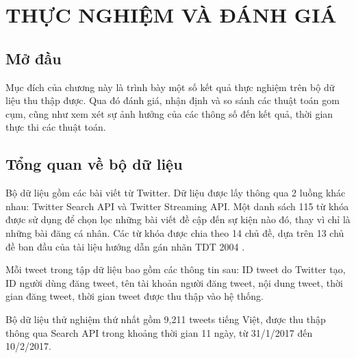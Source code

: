 \chapter{THỰC NGHIỆM VÀ ĐÁNH GIÁ}
\ifpdf
    \graphicspath{{Chapter4/Chapter4Figs/PNG/}{Chapter4/Chapter4Figs/PDF/}{Chapter4/Chapter4Figs/}}
\else
    \graphicspath{{Chapter4/Chapter4Figs/EPS/}{Chapter4/Chapter4Figs/}}
\fi

\section{Mở đầu}
Mục đích của chương này là trình bày một số kết quả thực nghiệm trên bộ dữ liệu thu thập được. Qua đó đánh giá, nhận định và so sánh các thuật toán gom cụm, cũng như xem xét sự ảnh hưởng của các thông số đến kết quả, thời gian thực thi các thuật toán.

\section{Tổng quan về bộ dữ liệu}
Bộ dữ liệu gồm các bài viết từ Twitter. Dữ liệu được lấy thông qua 2 luồng khác nhau: Twitter Search API và Twitter Streaming API. Một danh sách 115 từ khóa được sử dụng để chọn lọc những bài viết đề cập đến sự kiện nào đó, thay vì chỉ là những bài đăng cá nhân. Các từ khóa được chia theo 14 chủ đề, dựa trên 13 chủ đề ban đầu của tài liệu hướng dẫn gán nhãn TDT 2004 \cite{TDT2004Annotation}. %

Mỗi tweet trong tập dữ liệu bao gồm các thông tin sau: ID tweet do Twitter tạo, ID người dùng đăng tweet, tên tài khoản người đăng tweet, nội dung tweet, thời gian đăng tweet, thời gian tweet được thu thập vào hệ thống.

Bộ dữ liệu thử nghiệm thứ nhất gồm 9,211 tweets tiếng Việt, được thu thập thông qua Search API trong khoảng thời gian 11 ngày, từ 31/1/2017 đến 10/2/2017.


